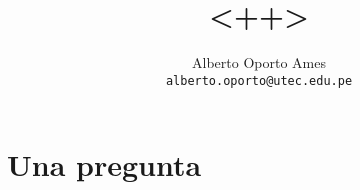 \documentclass[12pt]{article}
\title{<++>}
\author{
		Alberto Oporto Ames\\
		\texttt{alberto.oporto@utec.edu.pe} \\
		}
\begin{document}
\maketitle

\section{Una pregunta}%
\label{sec:una_pregunta}
\end{document}
